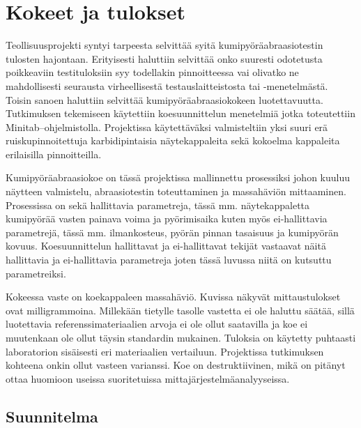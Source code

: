 \documentclass[12pt,a4paper,finnish]{tutthesis}
\begin{document}
\chapter{Kokeet ja tulokset}
\label{ch:kokeet}


Teollisuusprojekti syntyi tarpeesta selvittää syitä
kumipyöräabraasiotestin tulosten hajontaan. Erityisesti
haluttiin selvittää onko suuresti odotetusta poikkeaviin
testituloksiin syy todellakin pinnoitteessa vai olivatko
ne mahdollisesti seurausta virheellisestä testauslaitteistosta
tai -menetelmästä. Toisin sanoen haluttiin selvittää
kumipyöräabraasiokokeen luotettavuutta. Tutkimuksen tekemiseen
käytettiin koesuunnittelun menetelmiä jotka
toteutettiin Minitab–ohjelmistolla. Projektissa käytettäväksi
valmisteltiin yksi suuri erä ruiskupinnoitettuja karbidipintaisia näytekappaleita
sekä kokoelma kappaleita erilaisilla pinnoitteilla.

Kumipyöräabraasiokoe on tässä projektissa mallinnettu prosessiksi johon kuuluu
näytteen valmistelu, abraasiotestin toteuttaminen ja massahäviön
mittaaminen. Prosessissa on sekä hallittavia parametreja, tässä mm.
näytekappaletta kumipyörää vasten painava
voima ja pyörimisaika kuten myös ei-hallittavia parametrejä, tässä mm.
ilmankosteus, pyörän pinnan tasaisuus ja kumipyörän kovuus.
Koesuunnittelun hallittavat ja ei-hallittavat
tekijät vastaavat näitä hallittavia ja ei-hallittavia parametreja joten
tässä luvussa niitä on kutsuttu parametreiksi.

Kokeessa vaste on koekappaleen massahäviö.
Kuvissa näkyvät mittaustulokset ovat milligrammoina.
Millekään tietylle tasolle
vastetta ei ole haluttu säätää, sillä luotettavia referenssimateriaalien
arvoja ei ole ollut saatavilla ja koe ei muutenkaan ole ollut täysin
standardin mukainen. Tuloksia on käytetty puhtaasti laboratorion
sisäisesti eri materiaalien vertailuun. Projektissa tutkimuksen
kohteena onkin ollut vasteen varianssi. Koe on destruktiivinen,
mikä on pitänyt ottaa huomioon useissa suoritetuissa
mittajärjestelmäanalyyseissa.



\section{Suunnitelma}
\end{document}
